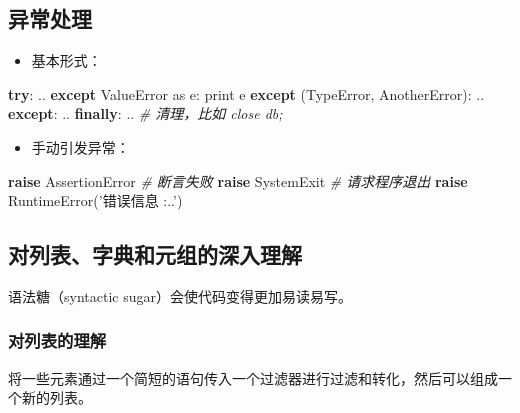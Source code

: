 \documentclass[]{ctexart}
\newenvironment{Shaded}{}{}
\newcommand{\StringTok}[1]{\textcolor[rgb]{0.25,0.44,0.63}{{#1}}}
\newcommand{\ImportTok}[1]{{#1}}
\newcommand{\CommentTok}[1]{\textcolor[rgb]{0.38,0.63,0.69}{\textit{{#1}}}}
\newcommand{\ControlFlowTok}[1]{\textcolor[rgb]{0.00,0.44,0.13}{\textbf{{#1}}}}
\newcommand{\BuiltInTok}[1]{{#1}}
\newcommand{\PreprocessorTok}[1]{\textcolor[rgb]{0.74,0.48,0.00}{{#1}}}
\newcommand{\NormalTok}[1]{{#1}}
\begin{document}
\hypertarget{header-n351}{\subsection{异常处理}\label{header-n351}}

\begin{itemize}
\item
  基本形式：
\end{itemize}

\begin{Shaded}
\begin{Highlighting}[]
\ControlFlowTok{try}\NormalTok{:}
  \NormalTok{..}
\ControlFlowTok{except} \PreprocessorTok{ValueError} \ImportTok{as} \NormalTok{e:}
  \BuiltInTok{print} \NormalTok{e}
\ControlFlowTok{except} \NormalTok{(}\PreprocessorTok{TypeError}\NormalTok{, AnotherError):}
  \NormalTok{..}
\ControlFlowTok{except}\NormalTok{:}
  \NormalTok{..}
\ControlFlowTok{finally}\NormalTok{:}
  \NormalTok{.. }\CommentTok{# 清理，比如 close db;}
\end{Highlighting}
\end{Shaded}

\begin{itemize}
\item
  手动引发异常：
\end{itemize}

\begin{Shaded}
\begin{Highlighting}[]
\ControlFlowTok{raise} \PreprocessorTok{AssertionError} \CommentTok{# 断言失败}
\ControlFlowTok{raise} \PreprocessorTok{SystemExit}
\CommentTok{# 请求程序退出}
\ControlFlowTok{raise} \PreprocessorTok{RuntimeError}\NormalTok{(}\StringTok{'错误信息 :..'}\NormalTok{)}
\end{Highlighting}
\end{Shaded}

\hypertarget{header-n362}{\subsection{对列表、字典和元组的深入理解}\label{header-n362}}

语法糖（syntactic sugar）会使代码变得更加易读易写。

\subsubsection{对列表的理解}\label{header-n365}

将一些元素通过一个简短的语句传入一个过滤器进行过滤和转化，然后可以组成一个新的列表。
\end{document}
